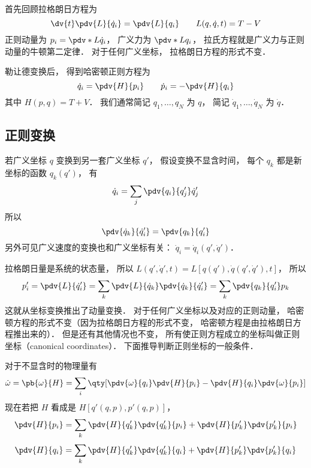 
\begin{issues}
\issueDraft
\end{issues}


首先回顾拉格朗日方程为
\begin{equation}
\dv{t} \pdv{L}{\dot q_i}  = \pdv{L}{q_i}  \qquad L(q,\dot q, t) = T - V
\end{equation}
正则动量为 $p_i = \pdv*{L}{\dot q_i}$， 广义力为 $\pdv*{L}{q_i}$，  拉氏方程就是广义力与正则动量的牛顿第二定律． 对于任何广义坐标， 拉格朗日方程的形式不变．

勒让德变换后， 得到哈密顿正则方程为
\begin{equation}
\dot q_i = \pdv{H}{p_i} \qquad
\dot p_i = -\pdv{H}{q_i}
\end{equation} 
其中 $H(p,q) = T + V$． 我们通常简记 $q_1, \dots, q_N$ 为 $q$， 简记 $\dot q_1, \dots, \dot q_N$ 为 $\dot q$．

\subsection{正则变换}

若广义坐标 $q$ 变换到另一套广义坐标 $q'$， 假设变换不显含时间， 每个 $q_k$ 都是新坐标的函数 $q_k(q')$， 有
\begin{equation}
\dot q_i = \sum_j \pdv{q_i}{q'_j} \dot q'_j
\end{equation}
所以
\begin{equation}
\pdv{\dot q_k}{\dot q'_i} = \pdv{q_k}{q'_i}
\end{equation}
另外可见广义速度的变换也和广义坐标有关： $\dot q_i = \dot q_i(q', \dot q')$．

拉格朗日量是系统的状态量， 所以 $L(q',\dot q', t) = L[q(q'),\dot q(q',\dot q'), t]$，  所以
\begin{equation}
p'_i = \pdv{L}{\dot q'_i} = \sum_k \pdv{L}{\dot q_k} \pdv{\dot q_k}{\dot q'_i}  = \sum_k \pdv{q_k}{q'_i} p_k
\end{equation}
这就从坐标变换推出了动量变换． 对于任何广义坐标以及对应的正则动量， 哈密顿方程的形式不变（因为拉格朗日方程的形式不变， 哈密顿方程是由拉格朗日方程推出来的）． 但是还有其他情况也不变， 所有使正则方程成立的坐标叫做正则坐标（canonical coordinates）． 下面推导判断正则坐标的一般条件．

对于不显含时的物理量有
\begin{equation}
\dot \omega  = \pb{\omega}{H}  = \sum_i \qty[\pdv{\omega}{q_i}\pdv{H}{p_i} - \pdv{H}{q_i} \pdv{\omega}{p_i}]
\end{equation}
现在若把 $H$ 看成是 $H[q'(q,p),p'(q,p)]$，  
\begin{equation}
\pdv{H}{p_i} = \sum_k \pdv{H}{q'_k} \pdv{q'_k}{p_i} + \pdv{H}{p'_k} \pdv{p'_k}{p_i}
\end{equation}
\begin{equation}
\pdv{H}{q_i} = \sum_k \pdv{H}{q'_k} \pdv{q'_k}{q_i} + \pdv{H}{p'_k} \pdv{p'_k}{q_i}
\end{equation}
 
